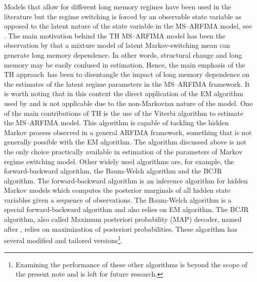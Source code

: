 \documentclass[11pt,fleqn]{article}
\begin{document}
Models that allow for different long memory regimes have been used in the
literature but the regime switching is forced by an observable state
variable as opposed to the latent nature of the state variable in the
MS--ARFIMA model, see \cite{Haldrup2006}. The main motivation behind the TH
MS--ARFIMA model has been the observation by \cite{Diebold2001} that a
mixture model of latent Markov-switching mean can generate long memory
dependence. In other words, structural change and long memory may be easily
confused in estimation. Hence, the main emphasis of the TH approach\ has
been to disentangle the impact of long memory dependence on the estimates of
the latent regime parameters in the MS--ARFIMA framework. It is worth noting
that in this context the direct application of the EM algorithm used by \cite%
{Hamilton1989} and \cite{Hamilton1990} is not applicable due to the
non-Markovian nature of the model. One of the main contributions of TH is
the use of the Viterbi algorithm to estimate the MS--ARFIMA model. This
algorithm is capable of tackling the hidden Markov process observed in a
general ARFIMA framework, something that is not generally possible with the
EM algorithm. The algorithm discussed above is not the only choice
practically available in estimation of the parameters of Markov regime
switching model. Other widely used algorithms are, for example, the
forward-backward algorithm, the Baum-Welch algorithm and the BCJR algorithm.
The forward-backward algorithm is an inference algorithm for hidden Markov
models which computes the posterior marginals of all hidden state variables
given a sequence of observations. The Baum-Welch algorithm is a special
forward-backward algorithm and also relies on EM algorithm. The BCJR
algorithm, also called Maximum posteriori probability (MAP) decoder, named
after \cite{Bahl:1974}, relies on maximization of posteriori probabilities.
These algorithm has several modified and tailored versions\footnote{%
Examining the performance of these other algorithms is beyond the scope of
the present note and is left for future research.}. 
\end{document}
